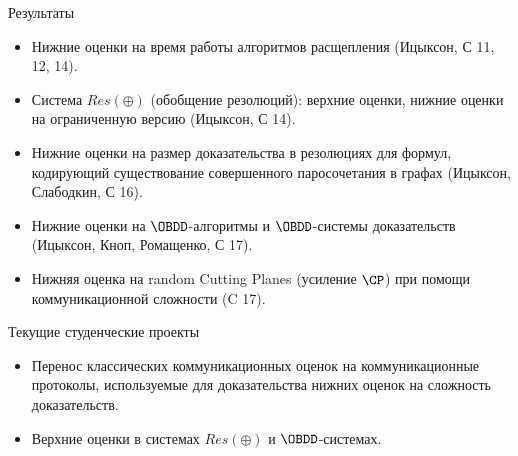 \begin{frame}{Результаты}

    \begin{itemize}
        \item Нижние оценки на время работы алгоритмов расщепления (Ицыксон, С 11, 12, 14).
        \pause
        \item Система $Res(\oplus)$ (обобщение резолюций): верхние оценки, нижние оценки на ограниченную версию (Ицыксон,
            С 14).
        \pause
        \item Нижние оценки на размер доказательства в резолюциях для формул, кодирующий существование совершенного
            паросочетания в графах (Ицыксон, Слабодкин, С 16).
        \pause
        \item Нижние оценки на $\OBDD$-алгоритмы и $\OBDD$-системы доказательств (Ицыксон, Кноп, Ромащенко, С 17).
        \pause
        \item Нижняя оценка на {\color{blue} random} Cutting Planes (усиление $\CP$) при помощи коммуникационной сложности (C
            17).
    \end{itemize}

\end{frame}


\begin{frame}{Текущие студенческие проекты}

    \begin{itemize}
        \item Перенос классических коммуникационных оценок на коммуникационные протоколы, используемые
            для доказательства нижних оценок на сложность доказательств.
        \pause
        \item Верхние оценки в системах $Res(\oplus)$ и $\OBDD$-системах.    
    \end{itemize}
\end{frame}